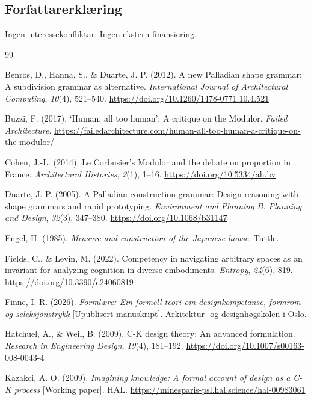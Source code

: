 \documentclass[10pt,twocolumn]{article}
\begin{document}
\subsection*{Forfattarerkl\ae ring}
Ingen interessekonfliktar. Ingen ekstern finansiering.

\begin{thebibliography}{99}
\footnotesize
\setlength{\itemsep}{0pt}
\setlength{\parskip}{0pt}

Benros, D., Hanna, S., \& Duarte, J. P. (2012). A new Palladian shape grammar: A subdivision grammar as alternative. \emph{International Journal of Architectural Computing}, \emph{10}(4), 521--540. \url{https://doi.org/10.1260/1478-0771.10.4.521}

Buzzi, F. (2017). `Human, all too human': A critique on the Modulor. \emph{Failed Architecture}. \url{https://failedarchitecture.com/human-all-too-human-a-critique-on-the-modulor/}

Cohen, J.-L. (2014). Le Corbusier's Modulor and the debate on proportion in France. \emph{Architectural Histories}, \emph{2}(1), 1--16. \url{https://doi.org/10.5334/ah.bv}

Duarte, J. P. (2005). A Palladian construction grammar: Design reasoning with shape grammars and rapid prototyping. \emph{Environment and Planning B: Planning and Design}, \emph{32}(3), 347--380. \url{https://doi.org/10.1068/b31147}

Engel, H. (1985). \emph{Measure and construction of the Japanese house}. Tuttle.

Fields, C., \& Levin, M. (2022). Competency in navigating arbitrary spaces as an invariant for analyzing cognition in diverse embodiments. \emph{Entropy}, \emph{24}(6), 819. \url{https://doi.org/10.3390/e24060819}

Finne, I. R. (2026). \emph{Forml\ae re: Ein formell teori om designkompetanse, formrom og seleksjonstrykk} [Upublisert manuskript]. Arkitektur- og designh\o{}gskolen i Oslo.

Hatchuel, A., \& Weil, B. (2009). C-K design theory: An advanced formulation. \emph{Research in Engineering Design}, \emph{19}(4), 181--192. \url{https://doi.org/10.1007/s00163-008-0043-4}

Kazakci, A. O. (2009). \emph{Imagining knowledge: A formal account of design as a C-K process} [Working paper]. HAL. \url{https://minesparis-psl.hal.science/hal-00983061}


\end{thebibliography}
\end{document}

